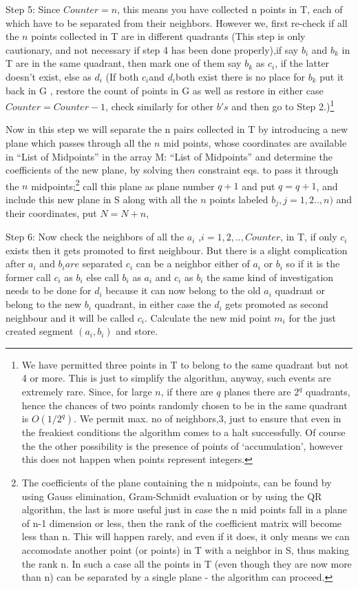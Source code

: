 \documentclass[english]{article}
\begin{document}
Step 5: Since $Counter=n$, this means you have collected n points
in T, each of which have to be separated from their neighbors. However
we, first re-check if all the $n$ points collected in T are in different
quadrants (This step is only cautionary, and not necessary if step 4 has been done properly),if say $b_{i}$ and $b_{k}$ in T
are in the same quadrant, then mark one of them say $b_{k}$
as $c_{i}$, if the latter doesn't exist, else as $d_{i}$ (If both
$c_{i}$and $d_{i}$both exist there is no place for $b_{k}$ put it
back in G , restore the count of points in G as well as restore in
either case$Counter=Counter-1$, check similarly for other $b's$
and then go to Step 2.)\footnote{We have permitted three points in T to belong to the same quadrant
but not 4 or more. This is just to simplify the algorithm, anyway,
such events are extremely rare. Since, for large $n$, if there are
$q$ planes there are $2^{q}$ quadrants, hence the chances of two
points randomly chosen to be in the same quadrant is $O(1/2^{q})$.
We permit max. no of neighbors,3, just to ensure that even in the
freakiest conditions the algorithm comes to a halt successfully. Of
course the the other possibility is the presence of points of `accumulation',
however this does not happen when points represent integers.}

Now in this step we will separate the n pairs collected in T by introducing
a new plane which passes through all the $n$ mid points, whose coordinates
are available in {}``List of Midpoints'' in the array M: {}``List
of Midpoints'' and determine the coefficients of the new plane, by
solving the$n$ constraint eqs. to pass it through the $n$ midpoints;\footnote{The coefficients of the plane containing the n midpoints, can be found
by using Gauss elimination, Gram-Schmidt evaluation or by using the
QR algorithm, the last is more useful just in case the n mid points
fall in a plane of n-1 dimension or less, then the rank of the coefficient
matrix will become less than n. This will happen rarely, and even
if it does, it only means we can accomodate another point (or points)
in T with a neighbor in S, thus making the rank n. In such a case
all the points in T (even though they are now more than n) can be
separated by a single plane - the algorithm can proceed.} call this plane as plane number $q+1$ and put $q=q+1$, and include
this new plane in S along with all the $n$ points labeled $b_{j},j=1,2..,n)$
and their coordinates, put $N=N+n$,

Step 6: Now check the neighbors of all the $a_{i}$ ,$i=1,2,..,Counter$, in T,
if only $c_{i}$ exists then it gets promoted to first neighbour.
But there is a slight complication after $a_{i}$ and $b_{i}are$
separated $c_{i}$ can be a neighbor either of $a_{i}$ or $b_{i}$
so if it is the former call $c_i$ as $b_i$ else call $b_i$  as
$a_i$ and $c_i $ as  $b_i$ the same kind of investigation needs
to be done for $d_i $ because it can now belong to the old  $ a_i $ 
quadrant or belong to the new $b_i $ quadrant, in either case the
$d_i$ gets promoted as second neighbour and it will be called $c_{i}$.
Calculate the new mid point $m_{i}$ for the just created segment
$(a_{i},b_{i})$ and store.
\end{document}
